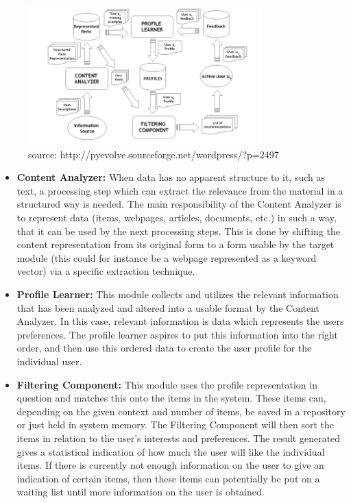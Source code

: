 \begin{figure}[H]
\centering
\includegraphics[width=90mm]{Pictures/contentdescription.png}
\caption{source: http://pyevolve.sourceforge.net/wordpress/?p=2497}
\label{contentdescription}
\end{figure}

\begin{itemize}
	\item \textbf{Content Analyzer:} When data has no apparent structure to it, such as text, a processing step which can extract the relevance from the material in a structured way is needed. \newline
	The main responsibility of the Content Analyzer is to represent data (items, webpages, articles, documents, etc.) in such a way, that it can be used by the next processing steps. This is done by shifting the content representation from its original form to a form usable by the target module (this could for instance be a webpage represented as a keyword vector) via a specific extraction technique.
	
	\item \textbf{Profile Learner:} This module collects and utilizes the relevant information that has been analyzed and altered into a usable format by the Content Analyzer. In this case, relevant information is data which represents the users preferences. The profile learner aspires to put this information into the right order, and then use this ordered data to create the user profile for the individual user.
	
	\item \textbf{Filtering Component:} This module uses the profile representation in question and matches this onto the items in the system. These items can, depending on the given context and number of items, be saved in a repository or just held in system memory. The Filtering Component will then sort the items in relation to the user's interests and preferences.\newline
	The result generated gives a statistical indication of how much the user will like the individual items. If there is currently not enough information on the user to give an indication of certain items, then these items can potentially be put on a waiting list until more information on the user is obtained.
\end{itemize}

